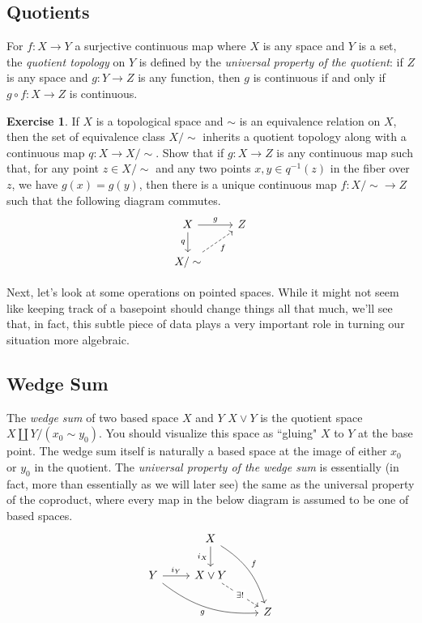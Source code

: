 \documentclass[10pt]{amsart}
\theoremstyle{definition}
\newtheorem{exercise}[thm]{Exercise}
\newcommand{\cdef}[1]{\textcolor{Bittersweet}{#1}}
\begin{document}
\subsection*{Quotients}
For $f:X \to Y$ a surjective continuous map where $X$ is any space and $Y$ is a set, the \cdef{\emph{quotient topology}} on $Y$ is defined by the \cdef{\emph{universal property of the quotient}}: if $Z$ is any space and $g:Y \to Z$ is any function, then $g$ is continuous if and only if $g \circ f:X \to Z$ is continuous.

\begin{exercise}
    If $X$ is a topological space and $\sim$ is an equivalence relation on $X$, then the set of equivalence class $X/\sim$ inherits a quotient topology along with a continuous map $q:X \to X/\sim$. Show that if $g:X \to Z$ is any continuous map such that, for any point $z \in X/\sim$ and any two points $x, y \in q^{-1}(z)$ in the fiber over $z$, we have $g(x) = g(y)$, then there is a unique continuous map $f:X/\sim \to Z$ such that the following diagram commutes.
    \[\begin{tikzcd}
	X & Z \\
	{X/\sim}
	\arrow["g", from=1-1, to=1-2]
	\arrow["q"', from=1-1, to=2-1]
	\arrow["f"', dashed, from=2-1, to=1-2]
    \end{tikzcd}\]    
\end{exercise}

Next, let's look at some operations on pointed spaces. While it might not seem like keeping track of a basepoint should change things all that much, we'll see that, in fact, this subtle piece of data plays a very important role in turning our situation more algebraic. 

\subsection*{Wedge Sum}
The \cdef{\emph{wedge sum}} of two based space $X$ and $Y$ $X \vee Y$ is the quotient space $X \coprod Y/(x_0 \sim y_0)$. You should visualize this space as ``gluing" $X$ to $Y$ at the base point. The wedge sum itself is naturally a based space at the image of either $x_0$ or $y_0$ in the quotient. The \cdef{\emph{universal property of the wedge sum}} is essentially (in fact, more than essentially as we will later see) the same as the universal property of the coproduct, where every map in the below diagram is assumed to be one of based spaces.
\[\begin{tikzcd}
	& X \\
	Y & {X\vee Y} \\
	&& Z
	\arrow["i_X"', from=1-2, to=2-2]
	\arrow["f",bend left = 20, from=1-2, to=3-3]
	\arrow["i_Y",  from=2-1, to=2-2]
	\arrow["g"',bend right = 20, from=2-1, to=3-3]
	\arrow["{\exists!}"{description}, dashed, from=2-2, to=3-3]
\end{tikzcd}\]
\end{document}
